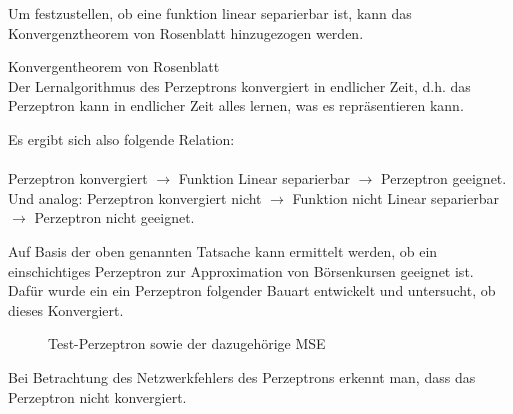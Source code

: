 Um festzustellen, ob eine funktion linear separierbar ist, kann das Konvergenztheorem von Rosenblatt hinzugezogen werden.

\begin{theo}Konvergentheorem von Rosenblatt\\
Der Lernalgorithmus des Perzeptrons konvergiert in endlicher Zeit, d.h. das Perzeptron kann in endlicher Zeit alles lernen, was es repräsentieren kann.
\end{theo}

Es ergibt sich also folgende Relation:\\\\
Perzeptron konvergiert $\rightarrow$ Funktion Linear separierbar $\rightarrow$ Perzeptron geeignet.
Und analog: Perzeptron konvergiert nicht $\rightarrow$ Funktion nicht Linear separierbar $\rightarrow$ Perzeptron nicht geeignet.

Auf Basis der oben genannten Tatsache kann ermittelt werden, ob ein einschichtiges Perzeptron zur Approximation von Börsenkursen geeignet ist. Dafür wurde ein ein Perzeptron folgender Bauart entwickelt und untersucht, ob dieses Konvergiert.
\begin{figure}[H]
\hfill
{}
\hfill
{}
\hfill
\caption{Test-Perzeptron sowie der dazugehörige MSE}
\end{figure}

Bei Betrachtung des Netzwerkfehlers des Perzeptrons erkennt man, dass das Perzeptron nicht konvergiert.


